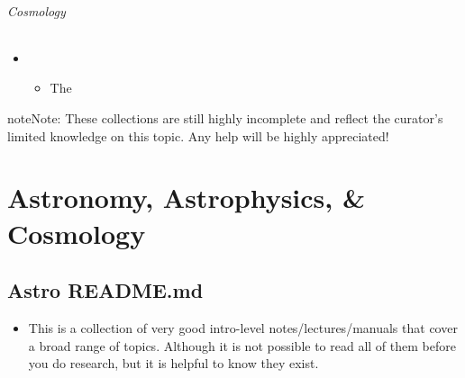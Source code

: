 \documentclass[letterpaper,10pt,english]{sphinxmanual}
\begin{document}
\subparagraph{Cosmology}
\label{\detokenize{resource/research/machine_learning/mlearning_astro_application:cosmology}}\begin{itemize}
\item {} 
\begin{itemize}
\item {} 
The 

\end{itemize}

\end{itemize}

\begin{sphinxadmonition}{note}{Note:}
These collections are still highly incomplete and reflect the curator’s limited knowledge on this
topic. Any help will be highly appreciated!
\end{sphinxadmonition}


\chapter{Astronomy, Astrophysics, \& Cosmology}
\label{\detokenize{index:astronomy-astrophysics-cosmology}}

\section{Astro README.md}
\label{\detokenize{resource/astro/astro_readme:astro-readme-md}}\label{\detokenize{resource/astro/astro_readme::doc}}\begin{itemize}
\item {} 
This is a collection of very good intro-level notes/lectures/manuals
that cover a broad range of topics. Although it is not possible to
read all of them before you do research, but it is helpful to know
they exist.

\end{itemize}
\end{document}
